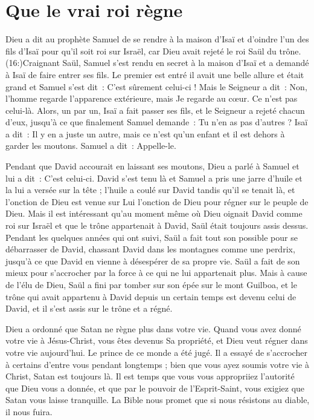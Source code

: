 \section{Que le vrai roi r\`egne}

Dieu a dit au prophète Samuel de se rendre à la maison d'Isaï et d'oindre
 l'un des fils d'Isaï pour qu'il soit roi sur Israël,
 car Dieu avait rejeté le roi Saül du trône.
 (16:)Craignant Saül,
 Samuel s'est rendu en secret à la maison d'Isaï
 et a demandé à Isaï de faire entrer ses fils.
 Le premier est entré \ocadr il avait une belle allure et était grand \fcadr{}
 et Samuel s'est dit~: \Og C'est sûrement celui-ci ! \Fg{}
 Mais le Seigneur a dit~: \Og Non, l'homme regarde l'apparence extérieure,
 mais Je regarde au cœur. Ce n'est pas celui-là. \Fg{}
 Alors, un par un, Isaï a fait passer ses fils, et le Seigneur a rejeté
 chacun d'eux, jusqu'à ce que finalement Samuel demande~:
 \Og Tu n'en as pas d'autres ? \Fg{}
 Isaï a dit~: \Og Il y en a juste un autre, mais ce n'est qu'un enfant
 et il est dehors à garder les moutons. \Fg{}
 Samuel a dit~: \Og Appelle-le. \Fg{}

Pendant que David accourait en laissant ses moutons,
 Dieu a parlé à Samuel et lui a dit~: \Og C'est celui-ci. \Fg{}
 David s'est tenu là et Samuel a pris une jarre d'huile
 et la lui a versée sur la tête ; l'huile a coulé sur David
 tandis qu'il se tenait là, et l'onction de Dieu est venue sur Lui
 \ocadr l'onction de Dieu pour régner sur le peuple de Dieu.
 Mais il est intéressant qu'au moment même où Dieu
 oignait David comme roi
 sur Israël et que le trône appartenait à David,
 Saül était toujours assis dessus. Pendant les quelques années qui ont suivi,
 Saül a fait tout son possible pour se débarrasser de David,
 chassant David dans les montagnes comme une perdrix,
 jusqu'à ce que David en vienne à désespérer de sa propre vie.
 Saül a fait de son mieux pour s'accrocher par la force à ce qui
 ne lui appartenait plus. Mais à cause de l'élu de Dieu,
 Saül a fini par tomber sur son épée sur le mont Guilboa,
 et le trône qui avait appartenu à David depuis un certain temps
 est devenu celui de David, et il s'est assis sur le trône et a régné.

Dieu a ordonné que Satan ne règne plus dans votre vie.
 Quand vous avez donné votre vie à Jésus-Christ, vous êtes devenus
 Sa propriété, et Dieu veut régner dans votre vie aujourd'hui.
 Le prince de ce monde a été jugé. Il a essayé de s'accrocher à certains
 d'entre vous pendant longtemps ; bien que vous ayez soumis votre vie
 à Christ, Satan est toujours là. Il est temps que vous vous appropriiez
 l'autorité que Dieu vous a donnée, et que par le pouvoir de l'Esprit-Saint,
 vous exigiez que Satan vous laisse tranquille.
 La Bible nous promet que si nous résistons au diable,
 il nous fuira.


